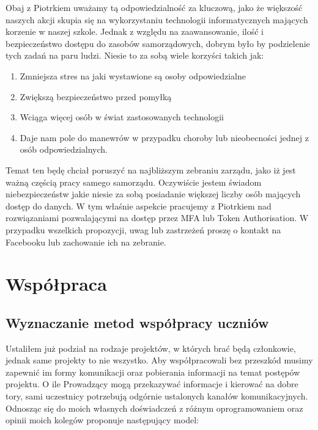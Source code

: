 \documentclass[9pt,a4paper]{report}
\begin{document}
Obaj z Piotrkiem uważamy tą odpowiedzialność za kluczową, jako że większość naszych akcji skupia się na wykorzystaniu technologii informatycznych mających korzenie w naszej szkole. Jednak z względu na zaawansowanie, ilość i bezpieczeństwo dostępu do zasobów samorządowych, dobrym było by podzielenie tych zadań na paru ludzi. Niesie to za sobą wiele korzyści takich jak:\\ 

\begin{enumerate} 

\item Zmniejsza stres na jaki wystawione są osoby odpowiedzialne 

\item Zwiększą bezpieczeństwo przed pomyłką 

\item Wciąga więcej osób w świat zastosowanych technologii 

\item Daje nam pole do manewrów w przypadku choroby lub nieobecności jednej z osób odpowiedzialnych. 

\end{enumerate} 

 

Temat ten będę chciał poruszyć na najbliższym zebraniu zarządu, jako iż jest ważną częścią pracy samego samorządu. Oczywiście jestem świadom niebezpieczeństw jakie niesie za sobą posiadanie większej liczby osób mających dostęp do danych. W tym właśnie aspekcie pracujemy z Piotrkiem nad rozwiązaniami pozwalającymi na dostęp przez MFA lub Token Authorisation. W przypadku wszelkich propozycji, uwag lub zastrzeżeń proszę o kontakt na Facebooku lub zachowanie ich na zebranie. 

 

\chapter{Współpraca} 

 

\section{Wyznaczanie metod współpracy uczniów} 

Ustaliłem już podział na rodzaje projektów, w których brać będą członkowie, jednak same projekty to nie wszystko. Aby współpracowali bez przeszkód musimy zapewnić im formy komunikacji oraz pobierania informacji na temat postępów projektu. O ile Prowadzący mogą przekazywać informacje i kierować na dobre tory, sami uczestnicy potrzebują odgórnie ustalonych kanałów komunikacyjnych. Odnosząc się do moich własnych doświadczeń z różnym oprogramowaniem oraz opinii moich kolegów proponuje następujący model:\\\\ 
\end{document}
